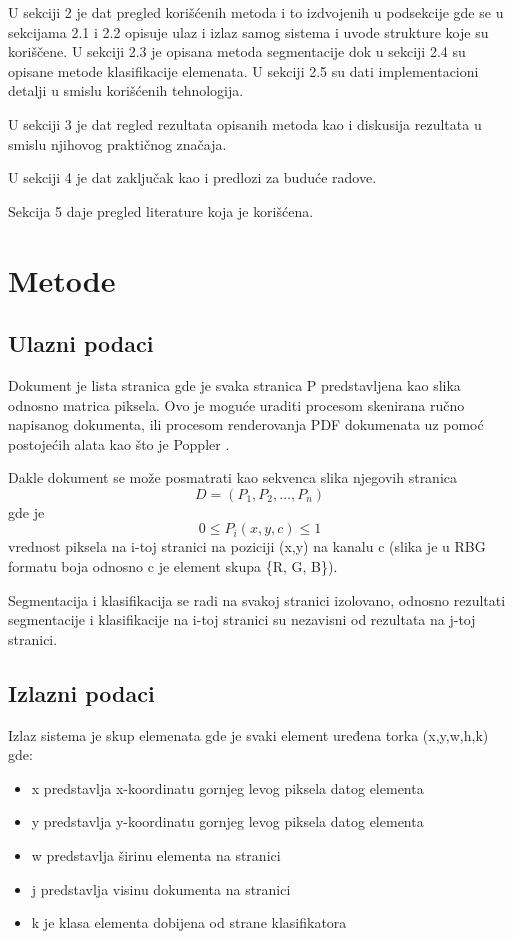 \documentclass[]{amsart}
\begin{document}
U sekciji 2 je dat pregled korišćenih metoda i to izdvojenih u podsekcije gde se u sekcijama 2.1 i 2.2 opisuje ulaz i izlaz samog sistema i uvode strukture koje su
koriščene. U sekciji 2.3 je opisana metoda segmentacije dok u sekciji 2.4 su opisane metode klasifikacije elemenata. U sekciji 2.5 su dati implementacioni detalji
u smislu korišćenih tehnologija.

U sekciji 3 je dat regled rezultata opisanih metoda kao i diskusija rezultata u smislu njihovog praktičnog značaja.

U sekciji 4 je dat zaključak kao i predlozi za buduće radove.

Sekcija 5 daje pregled literature koja je korišćena. 



\section{Metode}
\label{sec:orgdf3095c}
\subsection{Ulazni podaci}
\label{sec:org36199a1}

Dokument je lista stranica gde je svaka stranica P predstavljena kao slika odnosno matrica piksela. Ovo je moguće uraditi procesom skenirana ručno napisanog dokumenta, 
ili procesom renderovanja PDF dokumenata uz pomoć postojećih alata kao što je Poppler \cite{poppler}.

Dakle dokument se može posmatrati kao sekvenca slika njegovih stranica $$ D = (P_1, P_2, ..., P_n) $$ gde je $$ 0 \le P_{i}(x,y, c) \le 1$$ vrednost piksela na i-toj
stranici na poziciji (x,y) na kanalu c (slika je u RBG formatu boja odnosno c je element skupa \{R, G, B\}).

Segmentacija i klasifikacija se radi na svakoj stranici izolovano, odnosno rezultati segmentacije i klasifikacije na i-toj stranici su nezavisni od rezultata na j-toj
stranici.


\subsection{Izlazni podaci}
\label{sec:org75e117b}

Izlaz sistema je skup elemenata gde je svaki element uređena torka (x,y,w,h,k) gde:

\begin{itemize}
\item x predstavlja x-koordinatu gornjeg levog piksela datog elementa
\item y predstavlja y-koordinatu gornjeg levog piksela datog elementa
\item w predstavlja širinu elementa na stranici
\item j predstavlja visinu dokumenta na stranici
\item k je klasa elementa dobijena od strane klasifikatora
\end{itemize}
\end{document}
